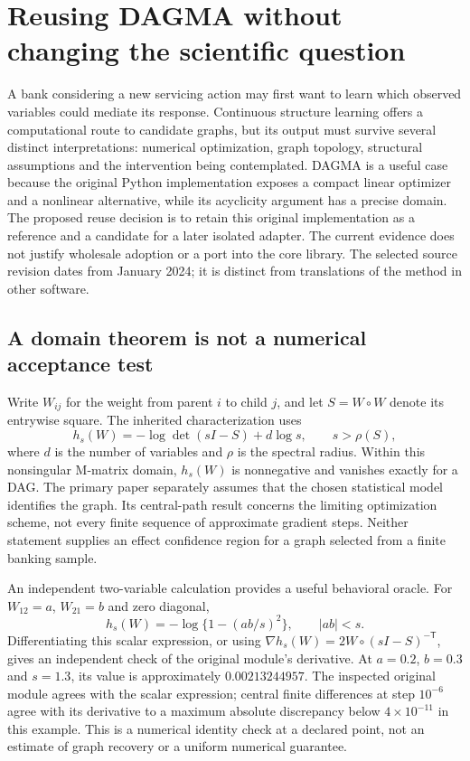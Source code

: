\section{Reusing DAGMA without changing the scientific question}
\label{exec16:dagma-reuse}

A bank considering a new servicing action may first want to learn which
observed variables could mediate its response. Continuous structure learning
offers a computational route to candidate graphs, but its output must survive
several distinct interpretations: numerical optimization, graph topology,
structural assumptions and the intervention being contemplated. DAGMA is a
useful case because the original Python implementation exposes a compact
linear optimizer and a nonlinear alternative, while its acyclicity argument
has a precise domain. The proposed reuse decision is to retain this original
implementation as a reference and a candidate for a later isolated adapter.
The current evidence does not justify wholesale adoption or a port into the
core library. The selected source revision dates from January 2024; it is
distinct from translations of the method in other software.
\citep{exec16_dagma_primary}

\subsection{A domain theorem is not a numerical acceptance test}

Write $W_{ij}$ for the weight from parent $i$ to child $j$, and let
$S=W\circ W$ denote its entrywise square. The inherited characterization
uses
\begin{equation}
 h_s(W)=-\log\det(sI-S)+d\log s,
 \qquad s>\rho(S),
 \label{exec16:dagma-domain}
\end{equation}
where $d$ is the number of variables and $\rho$ is the spectral radius.
Within this nonsingular M-matrix domain, $h_s(W)$ is nonnegative and vanishes
exactly for a DAG. The primary paper separately assumes that the chosen
statistical model identifies the graph. Its central-path result concerns
the limiting optimization scheme, not every finite sequence of approximate
gradient steps. Neither statement supplies an effect confidence region for
a graph selected from a finite banking sample.
\citep[Section 2, Theorem 1 and Lemma 6]{exec13_pydisc_dagma2022}

An independent two-variable calculation provides a useful behavioral oracle.
For $W_{12}=a$, $W_{21}=b$ and zero diagonal,
\begin{equation}
 h_s(W)=-\log\{1-(ab/s)^2\},\qquad |ab|<s.
\end{equation}
Differentiating this scalar expression, or using
$\nabla h_s(W)=2W\circ(sI-S)^{-\mathsf T}$, gives an independent check of
the original module's derivative. At $a=0.2$, $b=0.3$ and $s=1.3$, its value
is approximately $0.00213244957$. The inspected original module agrees with
the scalar expression; central finite differences at step $10^{-6}$ agree
with its derivative to a maximum absolute discrepancy below $4\times10^{-11}$
in this example. This is a numerical identity check at a declared point,
not an estimate of graph recovery or a uniform numerical guarantee.
\citep{exec16_dagma_exact}

